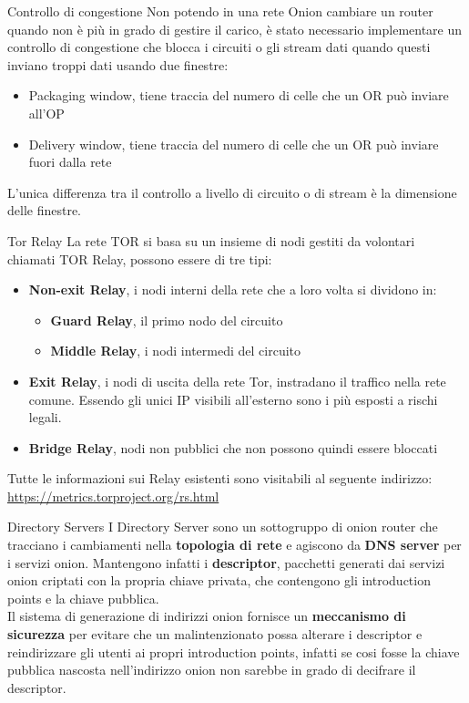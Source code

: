 \begin{frame}{Controllo di congestione}
    Non potendo in una rete Onion cambiare un router quando non è più in grado di gestire il carico, è stato necessario implementare un controllo di congestione che blocca i circuiti o gli stream dati quando questi inviano troppi dati usando due finestre:
    \begin{itemize}
        \item Packaging window, tiene traccia del numero di celle che un OR può inviare all'OP
        \item Delivery window, tiene traccia del numero di celle che un OR può inviare fuori dalla rete
    \end{itemize}
    L'unica differenza tra il controllo a livello di circuito o di stream è la dimensione delle finestre.
\end{frame}

\begin{frame}{Tor Relay}
    La rete TOR si basa su un insieme di nodi gestiti da volontari chiamati TOR Relay, possono essere di tre tipi:
    \begin{itemize}
        \item \textbf{Non-exit Relay}, i nodi interni della rete che a loro volta si dividono in:
        \begin{itemize}
            \item \textbf{Guard Relay}, il primo nodo del circuito
            \item \textbf{Middle Relay}, i nodi intermedi del circuito
        \end{itemize}
        \item \textbf{Exit Relay}, i nodi di uscita della rete Tor, instradano il traffico nella rete comune. Essendo gli unici IP visibili all'esterno sono i più esposti a rischi legali.
        \item \textbf{Bridge Relay}, nodi non pubblici che non possono quindi essere bloccati
    \end{itemize}
    Tutte le informazioni sui Relay esistenti sono visitabili al seguente indirizzo: \url{https://metrics.torproject.org/rs.html}

\end{frame}

\begin{frame}{Directory Servers} 
    I Directory Server sono un sottogruppo di onion router che tracciano i cambiamenti nella \textbf{topologia di rete} e agiscono da \textbf{DNS server} per i servizi onion.
    Mantengono infatti i \textbf{descriptor}, pacchetti generati dai servizi onion criptati con la propria chiave privata, che contengono gli introduction points e la chiave pubblica.\\
    
    Il sistema di generazione di indirizzi onion fornisce un \textbf{meccanismo di sicurezza} per evitare che un malintenzionato possa alterare i descriptor e reindirizzare gli utenti ai propri introduction points, infatti se cosi fosse la chiave pubblica nascosta nell'indirizzo onion non sarebbe in grado di decifrare il descriptor.
\end{frame}

